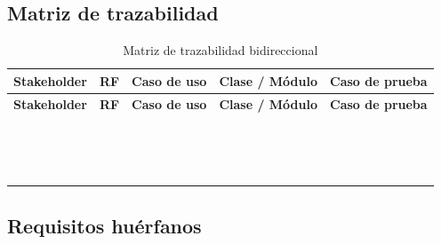 \documentclass[journal,onecolumn]{IEEEtran}
\newcommand{\guia}[2]{%
	\begin{mdframed}[style=guia]
		\sloppy
		\noindent\textbf{Responsable: #1}\\[2pt]
		#2
	\end{mdframed}
}
\newif\ifguias
\let\guiaoriginal\guia
\renewcommand{\guia}[2]{\ifguias\guiaoriginal{#1}{#2}\fi}
\begin{document}
	\guia{Jonathan (Integrante 3)}{%
		Configurar como mínimo dos campos: \textbf{Prioridad MoSCoW} y \textbf{Fuente del requisito}
		(stakeholder o documento de origen). Incluir captura de la configuración.\\[3pt]
		Los campos deben estar \textbf{configurados y usados} en todas las historias, no solo
		creados. El campo MoSCoW no hay que inventarlo: el ERS ya trae la priorización MoSCoW en su
		Sección 6.2, y los valores deben coincidir con ella. El campo Fuente puede alimentarse de
		las columnas Stakeholder e ID-EV de la matriz del ERS. Un tercer campo (estado de
		verificación) suma para el nivel Excelente.}
	
	\subsection{Matriz de trazabilidad}
	
	\begin{longtable}{L{2.6cm} L{1.8cm} L{2.5cm} L{3.2cm} L{2.6cm}}
		\caption{Matriz de trazabilidad bidireccional}\label{tab:matriz}\\
		\toprule
		\textbf{Stakeholder} & \textbf{RF} & \textbf{Caso de uso} & \textbf{Clase / Módulo} &
		\textbf{Caso de prueba} \\
		\midrule
		\endfirsthead
		\toprule
		\textbf{Stakeholder} & \textbf{RF} & \textbf{Caso de uso} & \textbf{Clase / Módulo} &
		\textbf{Caso de prueba} \\
		\midrule
		\endhead
		\bottomrule
		\endfoot
		& & & & \\
		& & & & \\
		& & & & \\
		& & & & \\
		& & & & \\
		& & & & \\
		& & & & \\
		& & & & \\
		& & & & \\
		& & & & \\
		& & & & \\
		& & & & \\
		& & & & \\
		& & & & \\
		& & & & \\
	\end{longtable}
	
	\subsection{Requisitos huérfanos}
	
\end{document}

